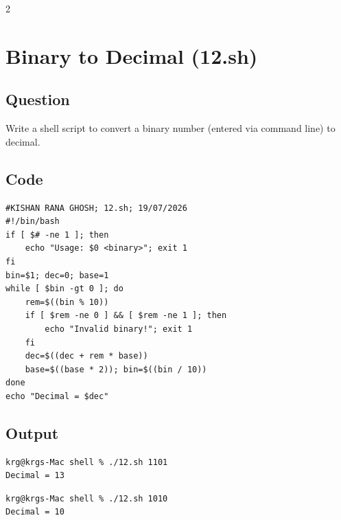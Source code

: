 \documentclass[a4paper,12pt]{article}
\begin{document}
\begin{multicols}{2}
\section{Binary to Decimal (12.sh)}
\subsection*{Question}
Write a shell script to convert a binary number (entered via command line) to decimal.

\subsection*{Code}
\begin{lstlisting}[style=bashstyle]
#KISHAN RANA GHOSH; 12.sh; 19/07/2026
#!/bin/bash
if [ $# -ne 1 ]; then
    echo "Usage: $0 <binary>"; exit 1
fi
bin=$1; dec=0; base=1
while [ $bin -gt 0 ]; do
    rem=$((bin % 10))
    if [ $rem -ne 0 ] && [ $rem -ne 1 ]; then
        echo "Invalid binary!"; exit 1
    fi
    dec=$((dec + rem * base))
    base=$((base * 2)); bin=$((bin / 10))
done
echo "Decimal = $dec"
\end{lstlisting}

\subsection*{Output}
\begin{lstlisting}[style=outputstyle]
krg@krgs-Mac shell % ./12.sh 1101
Decimal = 13
\end{lstlisting}
\begin{lstlisting}[style=outputstyle]
krg@krgs-Mac shell % ./12.sh 1010
Decimal = 10
\end{lstlisting}

\end{multicols}
\newpage
\end{document}
